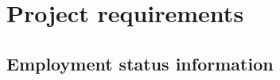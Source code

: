 \documentclass[a4paper,12pt]{article}
\begin{document}











\section{Project requirements}

\subsection{Employment status information}
\end{document}
